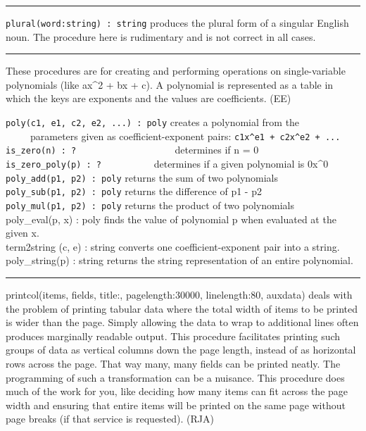 \vspace{0.25cm}\hrule{}

\texttt{plural(word:string) : string} produces the plural form of a singular English noun. The procedure here is
rudimentary and is not correct in all cases. 

\vspace{0.25cm}\hrule{}

These procedures are for creating and performing operations on
single-variable polynomials (like ax\^{}2 + bx + c).
A polynomial is represented as a table in which the keys are exponents
and the values are coefficients. (EE)

\texttt{poly(c1, e1, c2, e2, ...) : poly} creates a polynomial from
the\\
 \ \ \ \ \ parameters given as coefficient-exponent pairs:
\texttt{c1x\^{}e1 + c2x\^{}e2 + ...}\\
\texttt{is\_zero(n) : ?
\ }\ \ \ \ \ \ \ \ \ \ \ \ \ \ \ \ \ \ determines if n = 0\\
\texttt{is\_zero\_poly(p) : ?} \ \ \ \ \ \ \ \ \ \ determines if a given
polynomial is 0x\^{}0\\
\texttt{poly\_add(p1, p2) : poly} returns the sum of two
polynomials\\
\texttt{poly\_sub(p1, p2) : poly} returns the difference of p1 -
p2\\
\texttt{poly\_mul(p1, p2) : poly} returns the product of two
polynomials\\
\textsf{poly\_eval(p, x) : poly} finds the value of polynomial p when
evaluated at the given x.\\
\textsf{term2string (c, e) : string} converts one coefficient-exponent
pair into a string.\\
\textsf{poly\_string(p) : string} returns the string representation of
an entire polynomial. 

\vspace{0.25cm}\hrule{}

printcol(items, fields, title:{\textquotedbl}{\textquotedbl},
pagelength:30000, linelength:80, auxdata) deals with the problem of
printing tabular data where the total width of items to be printed is
wider than the page. Simply allowing the data to wrap to additional
lines often produces marginally readable output. This procedure
facilitates printing such groups of data as vertical columns down the
page length, instead of as horizontal rows across the page. That way
many, many fields can be printed neatly. The programming of such a
transformation can be a nuisance. This procedure does much of the work
for you, like deciding how many items can fit across the page width and
ensuring that entire items will be printed on the same page without
page breaks (if that service is requested). (RJA)


